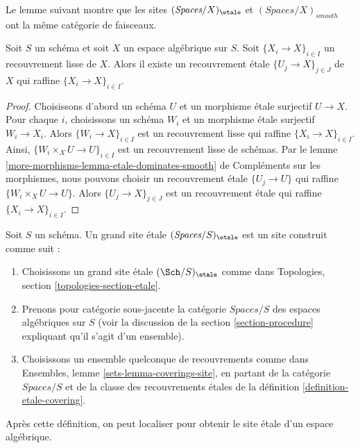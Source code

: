 \noindent
Le lemme suivant montre que les sites
$(\textit{Spaces}/X)_\etale$ et $(\textit{Spaces}/X)_{smooth}$
ont la même catégorie de faisceaux.

\begin{lemma}
\label{lemma-etale-dominates-smooth}
Soit $S$ un schéma et soit $X$ un espace algébrique sur $S$.
Soit $\{X_i \to X\}_{i \in I}$ un recouvrement lisse de $X$.
Alors il existe un recouvrement \'etale $\{U_j \to X\}_{j \in J}$
de $X$ qui raffine $\{X_i \to X\}_{i \in I}$.
\end{lemma}

\begin{proof}
Choisissons d'abord un schéma $U$ et un morphisme \'etale surjectif $U \to X$.
Pour chaque $i$, choisissons un schéma $W_i$ et un morphisme \'etale surjectif
$W_i \to X_i$. Alors $\{W_i \to X\}_{i \in I}$ est un recouvrement lisse
qui raffine $\{X_i \to X\}_{i \in I}$. Ainsi,
$\{W_i \times_X U \to U\}_{i \in I}$ est un recouvrement lisse de schémas.
Par le lemme \ref{more-morphisms-lemma-etale-dominates-smooth} de Compléments sur les morphismes,
nous pouvons choisir un recouvrement \'etale $\{U_j \to U\}$ qui raffine
$\{W_i \times_X U \to U\}$. Alors $\{U_j \to X\}_{j \in J}$
est un recouvrement \'etale qui raffine $\{X_i \to X\}_{i \in I}$.
\end{proof}

\begin{definition}
\label{definition-big-etale-site}
Soit $S$ un schéma. Un grand site \'etale {\it $(\textit{Spaces}/S)_\etale$}
est un site construit comme suit :
\begin{enumerate}
\item Choisissons un grand site \'etale $(\Sch/S)_\etale$ comme dans
Topologies, section \ref{topologies-section-etale}.
\item Prenons pour catégorie sous-jacente la catégorie $\textit{Spaces}/S$
des espaces algébriques sur $S$ (voir la discussion de la
section \ref{section-procedure} expliquant qu'il s'agit d'un ensemble).
\item Choisissons un ensemble quelconque de recouvrements comme dans
Ensembles, lemme \ref{sets-lemma-coverings-site}, en partant de la
catégorie $\textit{Spaces}/S$ et de la classe des recouvrements \'etales
de la définition \ref{definition-etale-covering}.
\end{enumerate}
\end{definition}

\noindent
Après cette définition, on peut localiser pour obtenir le site \'etale
d'un espace algébrique.

